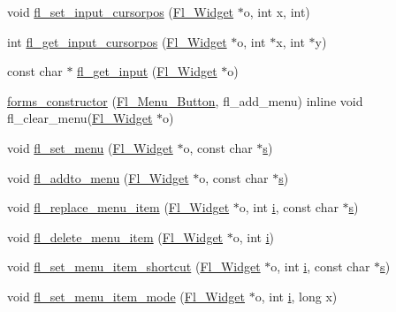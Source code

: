 \begin{DoxyCompactItemize}
\item 
void \hyperlink{forms_8_h_a1eec22c1bb01b4b7db52d34e5a1b638f}{fl\+\_\+set\+\_\+input\+\_\+cursorpos} (\hyperlink{class_fl___widget}{Fl\+\_\+\+Widget} $\ast$o, int x, int)
\item 
int \hyperlink{forms_8_h_af605ac3390c9bfca27322de0c6771150}{fl\+\_\+get\+\_\+input\+\_\+cursorpos} (\hyperlink{class_fl___widget}{Fl\+\_\+\+Widget} $\ast$o, int $\ast$x, int $\ast$y)
\item 
const char $\ast$ \hyperlink{forms_8_h_a71d9132a3eb953a8b9f313c5d9f9ca52}{fl\+\_\+get\+\_\+input} (\hyperlink{class_fl___widget}{Fl\+\_\+\+Widget} $\ast$o)
\item 
\hyperlink{forms_8_h_a76d5114240241be535b29487aa3de661}{forms\+\_\+constructor} (\hyperlink{class_fl___menu___button}{Fl\+\_\+\+Menu\+\_\+\+Button}, fl\+\_\+add\+\_\+menu) inline void fl\+\_\+clear\+\_\+menu(\hyperlink{class_fl___widget}{Fl\+\_\+\+Widget} $\ast$o)
\item 
void \hyperlink{forms_8_h_a24ce34ffb90ec262a9edac513a471bc1}{fl\+\_\+set\+\_\+menu} (\hyperlink{class_fl___widget}{Fl\+\_\+\+Widget} $\ast$o, const char $\ast$\hyperlink{forms_8_h_a672b4f0a8c8a6db61068c721f799d87f}{s})
\item 
void \hyperlink{forms_8_h_a2964d57ec59a7cf67b6ddcab4b0f9f70}{fl\+\_\+addto\+\_\+menu} (\hyperlink{class_fl___widget}{Fl\+\_\+\+Widget} $\ast$o, const char $\ast$\hyperlink{forms_8_h_a672b4f0a8c8a6db61068c721f799d87f}{s})
\item 
void \hyperlink{forms_8_h_ad1569481e54ca50fea923df8edb2ca70}{fl\+\_\+replace\+\_\+menu\+\_\+item} (\hyperlink{class_fl___widget}{Fl\+\_\+\+Widget} $\ast$o, int \hyperlink{forms_8_h_acb559820d9ca11295b4500f179ef6392}{i}, const char $\ast$\hyperlink{forms_8_h_a672b4f0a8c8a6db61068c721f799d87f}{s})
\item 
void \hyperlink{forms_8_h_a0f2014efa232f11052a9eebb6aef7db4}{fl\+\_\+delete\+\_\+menu\+\_\+item} (\hyperlink{class_fl___widget}{Fl\+\_\+\+Widget} $\ast$o, int \hyperlink{forms_8_h_acb559820d9ca11295b4500f179ef6392}{i})
\item 
void \hyperlink{forms_8_h_a59f8814bd08be6884626cc41dac24ac8}{fl\+\_\+set\+\_\+menu\+\_\+item\+\_\+shortcut} (\hyperlink{class_fl___widget}{Fl\+\_\+\+Widget} $\ast$o, int \hyperlink{forms_8_h_acb559820d9ca11295b4500f179ef6392}{i}, const char $\ast$\hyperlink{forms_8_h_a672b4f0a8c8a6db61068c721f799d87f}{s})
\item 
void \hyperlink{forms_8_h_ae8d81b69c71ae2c63ff23626c8bf25da}{fl\+\_\+set\+\_\+menu\+\_\+item\+\_\+mode} (\hyperlink{class_fl___widget}{Fl\+\_\+\+Widget} $\ast$o, int \hyperlink{forms_8_h_acb559820d9ca11295b4500f179ef6392}{i}, long x)

\end{DoxyCompactItemize}
